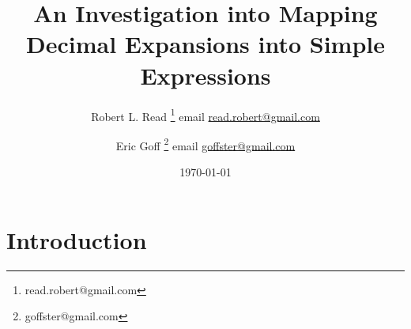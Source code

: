 \documentclass[11pt]{article}
\title{An Investigation into Mapping Decimal Expansions into Simple Expressions}
\author{Robert L. Read
  \thanks{read.robert@gmail.com}
   email \href{mailto:read.robert@gmail.com}{read.robert@gmail.com}
}
\author{Eric Goff
  \thanks{goffster@gmail.com}
  email \href{mailto:goffster@gmail.com}{goffster@gmail.com}
}
\affil{Founder, Public Invention, a non-profit.}
\date{\today}
\begin{document}
\maketitle

\abstract{
  }
\tableofcontents


\section{Introduction}
\end{document}
